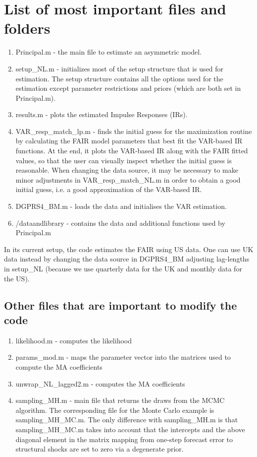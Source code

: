 \documentclass[a4paper,12pt]{article}
\begin{document}
\section{List of most important files and folders}
\begin{enumerate}
  \item Principal.m - the main file to estimate an asymmetric model.
	
  \item setup\_NL.m - initializes most of the setup structure that is used for estimation. The setup structure contains all the options used for the estimation except parameter restrictions and priors (which are both set in Principal.m). 
	
  \item results.m - plots the estimated Impulse Responses (IRs).

  \item VAR\_resp\_match\_lp.m - finds the initial guess for the maximization routine by calculating the FAIR model parameters that best fit the VAR-based IR functions. At the end, it plots the VAR-based IR along with the FAIR fitted values, so that the user can visually inspect whether the initial guess is reasonable. When changing the data source, it may be necessary to make minor adjustments in VAR\_resp\_match\_NL.m in order to obtain a good initial guess, i.e. a good approximation of the VAR-based IR.
  
  \item DGPRS4\_BM.m - loads the data and initialises the VAR estimation.
  
    \item /dataandlibrary - contains the data and additional functions used by Principal.m

  
  \end{enumerate}
  
In its current setup, the code estimates the FAIR using US data. One can use UK data instead by changing the data source in DGPRS4\_BM adjusting lag-lengths in setup\_NL (because we use quarterly data for the UK and monthly data for the US).

\subsection{Other files that are important to modify the code}
\begin{enumerate}
\item likelihood.m - computes the likelihood
\item params\_mod.m - maps the parameter vector into the matrices used to compute the MA coefficients
\item unwrap\_NL\_lagged2.m - computes the MA coefficients
\item sampling\_MH.m - main file that returns the draws from the MCMC algorithm. The corresponding file for the Monte Carlo example is sampling\_MH\_MC.m. The only difference with sampling\_MH.m is that sampling\_MH\_MC.m takes into account that the intercepts and the above diagonal element in the matrix mapping from one-step forecast error to structural shocks are set to zero via a degenerate prior.
\end{enumerate}
\end{document}
